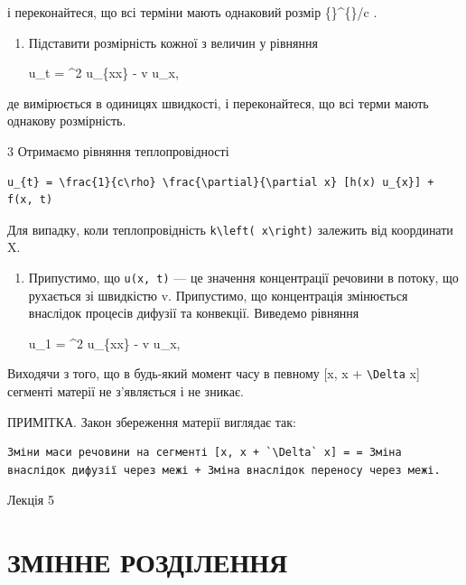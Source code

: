 \documentclass[
  ukrainian,
]{article}
\begin{document}
і переконайтеся, що всі терміни мають однаковий розмір
\{\}\^{}\{\circ\}/c .

\begin{enumerate}
\def\labelenumi{\arabic{enumi}.}
\setcounter{enumi}{1}
\item
  Підставити розмірність кожної з величин у рівняння

  u\_t = \alpha\^{}2 u\_\{xx\} - v u\_x,
\end{enumerate}

де \upsilon вимірюється в одиницях швидкості, і переконайтеся, що всі
терми мають однакову розмірність.

3 Отримаємо рівняння теплопровідності

\begin{verbatim}
u_{t} = \frac{1}{c\rho} \frac{\partial}{\partial x} [h(x) u_{x}] + f(x, t)
\end{verbatim}

Для випадку, коли теплопровідність
\texttt{k\textbackslash{}left(\ x\textbackslash{}right)} залежить від
координати X.

\begin{enumerate}
\def\labelenumi{\arabic{enumi}.}
\setcounter{enumi}{3}
\item
  Припустимо, що \texttt{u(x,\ t)} --- це значення концентрації речовини
  в потоку, що рухається зі швидкістю v. Припустимо, що концентрація
  змінюється внаслідок процесів дифузії та конвекції. Виведемо рівняння

  u\_1 = \alpha\^{}2 u\_\{xx\} - v u\_x,
\end{enumerate}

Виходячи з того, що в будь-який момент часу в певному {[}x, x +
\texttt{\textbackslash{}Delta} x{]} сегменті матерії не з'являється і не
зникає.

ПРИМІТКА. Закон збереження матерії виглядає так:

\begin{verbatim}
Зміни маси речовини на сегменті [x, x + `\Delta` x] = = Зміна внаслідок дифузії через межі + Зміна внаслідок переносу через межі.
\end{verbatim}

Лекція 5

\section{ЗМІННЕ
РОЗДІЛЕННЯ}\label{ux437ux43cux456ux43dux43dux435-ux440ux43eux437ux434ux456ux43bux435ux43dux43dux44f}
\end{document}
